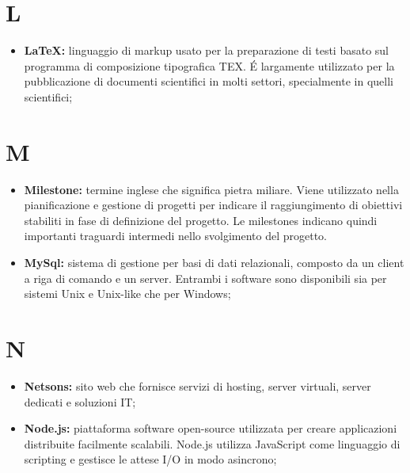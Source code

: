 %


\section*{L} %
\label{sec:l}
	\begin{itemize}
		\item \textbf{\LaTeX:} linguaggio di markup usato per la preparazione di testi basato sul programma di composizione tipografica TEX. É largamente utilizzato per la pubblicazione di documenti scientifici in molti settori, specialmente in quelli scientifici;
	\end{itemize}
\pagebreak

\section*{M} %
\label{sec:m}
	\begin{itemize}
		\item \textbf{Milestone:} termine inglese che significa pietra miliare. Viene utilizzato nella pianificazione e gestione di progetti per indicare il raggiungimento di obiettivi stabiliti in fase di definizione del progetto. Le milestones indicano quindi importanti traguardi intermedi nello svolgimento del progetto.		
		\item \textbf{MySql:} sistema di gestione per basi di dati relazionali, composto da un client a riga di comando e un server. Entrambi i software sono disponibili sia per sistemi Unix e Unix-like che per Windows;
	\end{itemize}
\pagebreak

\section*{N} %
\label{sec:n}
	\begin{itemize}
		\item \textbf{Netsons:} sito web che fornisce servizi di hosting, server virtuali, server dedicati e soluzioni IT;
		\item \textbf{Node.js:} piattaforma software open-source utilizzata per creare applicazioni distribuite facilmente scalabili. Node.js utilizza JavaScript come linguaggio di scripting e gestisce le attese I/O in modo asincrono;
	\end{itemize}
\pagebreak
